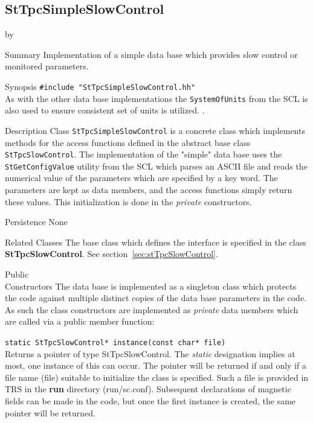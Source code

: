 \documentclass[twoside]{article}
\newcommand{\comp}[1]{\texttt{#1}}%
\newcommand{\entrylabel}[1]{\mbox{\textbf{{#1}}}\hfil}%
\newenvironment{entry}
{\begin{list}{}%
    {\renewcommand{\makelabel}{\entrylabel}%
     \setlength{\labelwidth}{90pt}%
     \setlength{\leftmargin}{\labelwidth}
     \advance\leftmargin by \labelsep%
      }%
    }%
  {\end{list}}
\newcommand{\Entrylabel}[1]%
{\raisebox{0pt}[1ex][0pt]{\makebox[\labelwidth][l]%
    {\parbox[t]{\labelwidth}{\hspace{0pt}\textbf{{#1}}}}}}
\newenvironment{Entry}%
{\renewcommand{\entrylabel}{\Entrylabel}\begin{entry}}%
  {\end{entry}}
\begin{document}
\subsection{StTpcSimpleSlowControl} 
\label{sec:stTpcSimpleSlowControl}
\begin{Entry}
\item[Summary]
  Implementation of a simple data base which provides slow
  control or monitored parameters.

\item[Synopsis]
  \verb+#include "StTpcSimpleSlowControl.hh"+\\
  As with the other data base implementations
  the \comp{SystemOfUnits} from the SCL is also used to ensure consistent
  set of units is utilized. .
  
\item[Description]
Class \comp{StTpcSimpleSlowControl} is a concrete class which implements
methods for the access functions defined in the abstract base
class \comp{StTpcSlowControl}.  The implementation of the "simple" data base 
uses the \comp{StGetConfigValue}
utility from the SCL which parses an ASCII file and reads the
numerical value of the parameters which are specified by a key word.  
The parameters are kept as data members, and the access functions
simply return these values.  This initialization is done in the
{\em private} constructors.

\item[Persistence]
   None

\item[Related Classes]
The base class which defines the interface is specified in
the class {\bf StTpcSlowControl}.  See 
section~\ref{sec:stTpcSlowControl}.

\item[Public \\ Constructors]
   The data base is implemented as a singleton class 
   which protects the code against multiple distinct copies of the
   data base parameters in the code.  As such the class constructors
   are implemented as {\em private} data members which are called
   via a public member function:

   \verb+static StTpcSlowControl* instance(const char* file)+\\
   Returns a pointer of type StTpcSlowControl.  The {\em static}
   designation implies at most, one instance of this can occur.
   The pointer will be returned if and only if a file name (file) 
   suitable to initialize the class is specified.  Such a file
   is provided in TRS in the {\bf run} directory (run/sc.conf).  Subsequent 
   declarations of magnetic fields can be made in the code, but
   once the first instance is created, the same pointer will
   be returned.


\end{Entry}
\end{document}
